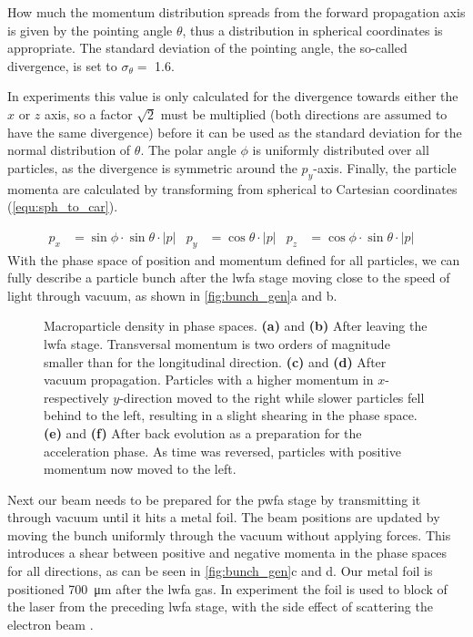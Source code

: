 \documentclass[bachelor_thesis]{subfiles}
\begin{document}
How much the momentum distribution spreads from the forward propagation axis is given by the pointing angle $\theta$, thus a distribution in spherical coordinates is appropriate. The standard deviation of the pointing angle, 
the so-called divergence, is set to $\sigma_{\theta}=$ \qty{1.6}{\mrad}.

In experiments this value is only calculated for the divergence towards either the $x$ or $z$ axis, so a factor $\sqrt{2}$ must be multiplied (both directions are assumed to have the same divergence) before 
it can be used as the standard deviation for the normal distribution of $\theta$. The polar angle $\phi$ is uniformly distributed over all particles, as the divergence is symmetric around the $p_y$-axis.
Finally, the particle momenta are calculated by transforming from spherical to Cartesian coordinates (\autoref{equ:sph_to_car}). 

\begin{align}
	p_x&=\sin{\phi} \cdot \sin{\theta} \cdot \left|p\right|	&
	p_y&=\cos{\theta} \cdot \left|p\right|				&
	p_z&=\cos{\phi} \cdot \sin{\theta} \cdot \left|p\right|	&
	\label{equ:sph_to_car}
\end{align}
With the phase space of position and momentum defined for all particles, we can fully describe a particle bunch after the \gls{lwfa} stage moving close to the speed of light through vacuum, as shown in \autoref{fig:bunch_gen}a and b.

\begin{figure}
	\centering
	
	\caption{Macroparticle density in phase spaces. 
	\textbf{(a)} and \textbf{(b)} After leaving the \gls{lwfa} stage. Transversal momentum is two orders of magnitude smaller than for the longitudinal direction.
	\textbf{(c)} and \textbf{(d)} After vacuum propagation. Particles with a higher momentum in $x$- respectively  $y$-direction moved to the right while slower particles fell behind to the left, resulting in a slight shearing in the phase space.
	\textbf{(e)} and \textbf{(f)} After back evolution as a preparation for the acceleration phase. As time was reversed, particles with positive momentum now moved to the left.}
	\label{fig:bunch_gen}
\end{figure}

Next our beam needs to be prepared for the \gls{pwfa} stage by transmitting it through vacuum until it hits a metal foil. The beam positions are updated by moving the bunch uniformly through the vacuum without applying forces. 
This introduces a shear between positive and negative momenta in the phase spaces for all directions, as can be seen in \autoref{fig:bunch_gen}c and d.
Our metal foil is positioned \qty{700}{\um} after the \gls{lwfa} gas. In experiment the foil is used to block of the laser from the preceding \gls{lwfa} stage, with the side effect of scattering the electron beam \cite{Raj2020}.
\end{document}
